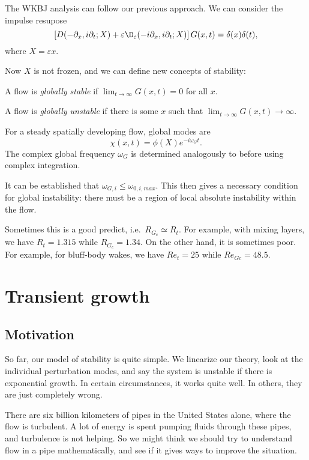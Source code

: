 \documentclass[a4paper]{article}
\begin{document}

The WKBJ analysis can follow our previous approach. We can consider the impulse resupose
\[
  \left[ D (-\partial_x, i \partial_t; X) + \varepsilon \D_\varepsilon (-i \partial_x, i \partial_t; X)\right] G(x, t) = \delta(x) \delta(t),
\]
where $X = \varepsilon x$.

Now $X$ is not frozen, and we can define new concepts of stability:
\begin{defi}
  A flow is \emph{globally stable} if $\lim_{t \to \infty} G(x, t) = 0$ for all $x$.

  A flow is \emph{globally unstable} if there is some $x$ such that $\lim_{t \to \infty} G(x, t) \to \infty$.
\end{defi}

For a steady spatially developing flow, global modes are
\[
  \chi(x, t) = \phi(X) e^{-i \omega_G t}.
\]
The complex global frequency $\omega_G$ is determined analogously to before using complex integration.

It can be established that $\omega_{G, i} \leq \omega_{0, i, max}$. This then gives a necessary condition for global instability: there must be a region of local absolute instability within the flow.

Sometimes this is a good predict, i.e.\ $R_{G_c} \simeq R_t$. For example, with mixing layers, we have $R_t = 1.315$ while $R_{G_c} = 1.34$. On the other hand, it is sometimes poor. For example, for bluff-body wakes, we have $Re_t = 25$ while $Re_{Gc} = 48.5$.

\section{Transient growth}
\subsection{Motivation}
So far, our model of stability is quite simple. We linearize our theory, look at the individual perturbation modes, and say the system is unstable if there is exponential growth. In certain circumstances, it works quite well. In others, they are just completely wrong.

There are six billion kilometers of pipes in the United States alone, where the flow is turbulent. A lot of energy is spent pumping fluids through these pipes, and turbulence is not helping. So we might think we should try to understand flow in a pipe mathematically, and see if it gives ways to improve the situation.
\end{document}
